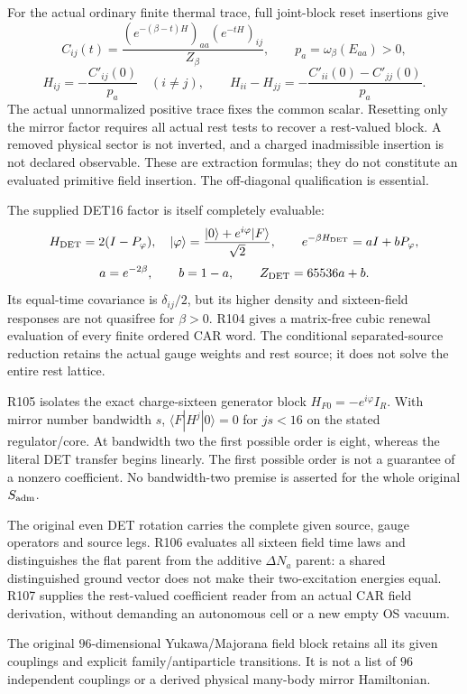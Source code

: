 For the actual ordinary finite thermal trace, full joint-block reset
insertions give
\[
 C_{ij}(t)=\frac{(e^{-(\beta-t)H})_{aa}(e^{-tH})_{ij}}{Z_\beta},
 \qquad p_a=\omega_\beta(E_{aa})>0,
\]
\[
 H_{ij}=-\frac{C'_{ij}(0)}{p_a}\quad(i\ne j),\qquad
 H_{ii}-H_{jj}=-\frac{C'_{ii}(0)-C'_{jj}(0)}{p_a}.
\]
The actual unnormalized positive trace fixes the common scalar.
Resetting only the mirror factor requires all actual rest tests to
recover a rest-valued block. A removed physical sector is not inverted,
and a charged inadmissible insertion is not declared observable.
These are extraction formulas; they do not constitute an evaluated
primitive field insertion. The off-diagonal qualification is essential.

The supplied DET16 factor is itself completely evaluable:
\[
 H_{\rm DET}=2(I-P_\varphi),\quad
 |\varphi\rangle=\frac{|0\rangle+e^{i\varphi}|F\rangle}{\sqrt2},
 \qquad e^{-\beta H_{\rm DET}}=aI+bP_\varphi,
\]
\[
 a=e^{-2\beta},\qquad b=1-a,\qquad
 Z_{\rm DET}=65536a+b.
\]
Its equal-time covariance is $\delta_{ij}/2$, but its higher density
and sixteen-field responses are not quasifree for $\beta>0$.
R104 gives a matrix-free cubic renewal evaluation of every finite
ordered CAR word. The conditional separated-source reduction retains
the actual gauge weights and rest source; it does not solve the entire
rest lattice.

R105 isolates the exact charge-sixteen generator block
$H_{F0}=-e^{i\varphi}I_R$. With mirror number bandwidth $s$,
$\langle F|H^j|0\rangle=0$ for $js<16$ on the stated regulator/core.
At bandwidth two the first possible order is eight, whereas the
literal DET transfer begins linearly. The first possible order is
not a guarantee of a nonzero coefficient. No bandwidth-two premise
is asserted for the whole original $S_{\rm adm}$.

The original even DET rotation carries the complete given source,
gauge operators and source legs. R106 evaluates all sixteen field
time laws and distinguishes the flat parent from the additive
$\Delta N_a$ parent: a shared distinguished ground vector does not
make their two-excitation energies equal. R107 supplies the
rest-valued coefficient reader from an actual CAR field derivation,
without demanding an autonomous cell or a new empty OS vacuum.

The original $96$-dimensional Yukawa/Majorana field block retains all
its given couplings and explicit family/antiparticle transitions.
It is not a list of $96$ independent couplings or a derived physical
many-body mirror Hamiltonian.

